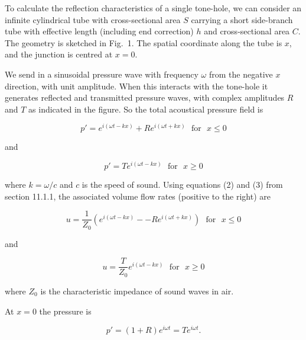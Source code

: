   To calculate the reflection characteristics of a single tone-hole, we can 
  consider an infinite cylindrical tube with cross-sectional area $S$ carrying 
  a short side-branch tube with effective length (including end correction) $h$ 
  and cross-sectional area $C$. The geometry is sketched in Fig.\ 1. The 
  spatial coordinate along the tube is $x$, and the junction is centred at 
  $x=0$. 


  We send in a sinusoidal pressure wave with frequency $\omega$ from the 
  negative $x$ direction, with unit amplitude. When this interacts with the 
  tone-hole it generates reflected and transmitted pressure waves, with complex 
  amplitudes $R$ and $T$ as indicated in the figure. So the total acoustical 
  pressure field is 

  \begin{equation*}p'=e^{i(\omega t -kx)} + R e^{i(\omega t +kx)} 
  \mathrm{~~~for~~~}x \le 0 \tag{1}\end{equation*} 

  \noindent{}and 

  \begin{equation*}p'=T e^{i(\omega t -kx)} \mathrm{~~~for~~~}x \ge 0 
  \tag{2}\end{equation*} 

  \noindent{}where $k=\omega /c$ and $c$ is the speed of sound. Using equations 
  (2) and (3) from section 11.1.1, the associated volume flow rates (positive 
  to the right) are 

  \begin{equation*}u=\dfrac{1}{Z_0}\left(e^{i(\omega t -kx)} -- R e^{i(\omega t 
  +kx)} \right) \mathrm{~~~for~~~}x \le 0 \tag{3}\end{equation*} 

  \noindent{}and 

  \begin{equation*}u=\dfrac{T}{Z_0} e^{i(\omega t -kx)} \mathrm{~~~for~~~}x \ge 
  0 \tag{4}\end{equation*} 

  \noindent{}where $Z_0$ is the characteristic impedance of sound waves in air. 

  At $x=0$ the pressure is 

  \begin{equation*}p'=(1+R)e^{i \omega t} = Te^{i \omega t} . 
  \tag{5}\end{equation*} 

